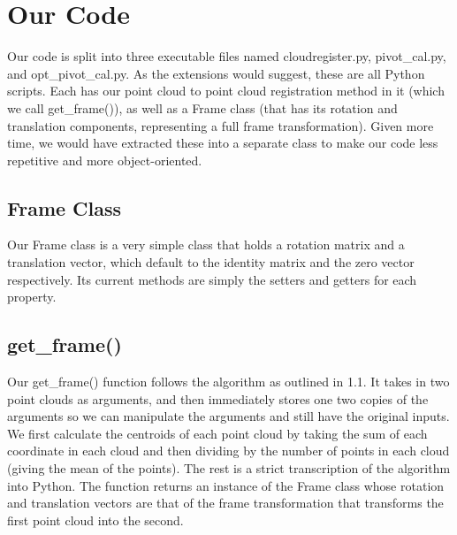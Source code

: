 \documentclass[a4paper]{article}
\begin{document}
\section{Our Code}
Our code is split into three executable files named cloudregister.py, pivot\_cal.py, and opt\_pivot\_cal.py. As the extensions would suggest, these are all Python scripts. Each has our point cloud to point cloud registration method in it (which we call get\_frame()), as well as a Frame class (that has its rotation and translation components, representing a full frame transformation). Given more time, we would have extracted these into a separate class to make our code less repetitive and more object-oriented.

\subsection{Frame Class}
Our Frame class is a very simple class that holds a rotation matrix and a translation vector, which default to the identity matrix and the zero vector respectively. Its current methods are simply the setters and getters for each property.

\subsection{get\_frame()}
Our get\_frame() function follows the algorithm as outlined in 1.1. It takes in two point clouds as arguments, and then immediately stores one two copies of the arguments so we can manipulate the arguments and still have the original inputs. We first calculate the centroids of each point cloud by taking the sum of each coordinate in each cloud and then dividing by the number of points in each cloud (giving the mean of the points). The rest is a strict transcription of the algorithm into Python. The function returns an instance of the Frame class whose rotation and translation vectors are that of the frame transformation that transforms the first point cloud into the second.
\end{document}
